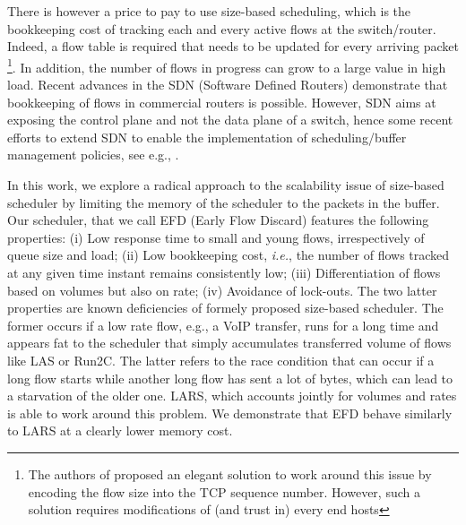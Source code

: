 \documentclass[preprint,12pt]{elsarticle}
\begin{document}
There is however a price to pay to use size-based scheduling, which is the bookkeeping cost of tracking each and every active flows at the switch/router. %
Indeed, a flow table is required that needs to be updated for every arriving packet \footnote{The authors of \cite{Avrachenkov04Run2c} proposed an elegant solution to work around this issue by encoding the flow size into the TCP sequence number. However, such a solution requires modifications of (and trust in) every end hosts}. %
In addition, the number of flows in progress can grow to a large value in high load. 
Recent advances in the SDN (Software Defined Routers) demonstrate that bookkeeping of flows in commercial routers is possible. However, SDN aims at exposing the control plane and not the data plane of a switch, hence some recent efforts to extend SDN to enable the implementation of scheduling/buffer management policies, see e.g., \cite{sivaraman2013no}.

In this work, we explore a radical approach to the scalability issue of size-based scheduler by limiting the memory of the scheduler to the packets in the buffer. Our scheduler, that we call  EFD (Early Flow Discard) features the following properties: (i) Low response time to small and young flows, irrespectively of queue size and load; (ii) Low bookkeeping cost, \textit{i.e.}, the number of flows tracked at any given time instant remains consistently low; (iii) Differentiation of flows based on volumes but also on rate; (iv) Avoidance of lock-outs. The two latter properties are known deficiencies of formely proposed size-based scheduler. The former occurs if a low rate flow, e.g., a VoIP transfer, runs for a long time and appears fat to the scheduler that simply accumulates transferred volume of flows like LAS or Run2C. The latter refers to the race condition that can occur if a long flow starts while another long flow has sent a lot of bytes, which can lead to a starvation of the older one. LARS, which accounts jointly for volumes and rates is able to work around this problem. We demonstrate that EFD behave similarly to LARS at a clearly lower memory cost.%
\end{document}
